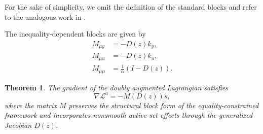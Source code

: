\documentclass[11pt]{article}
\newcommand{\DLag}{\mathcal L^a}
\newtheorem{theorem}{Theorem}
\begin{document}
For the sake of simplicity, we omit the definition of the standard blocks and refer to the analogous work in \cite{walther2018equality}.

The inequality-dependent blocks are given by
\begin{align}
M_{\mu y}
&=
-D(z)k_y,
\\
M_{\mu u}
&=
-D(z)k_u,
\\
M_{\mu\mu}
&=
\frac1\alpha(I-D(z)).
\end{align}

\begin{theorem}
The gradient of the doubly augmented Lagrangian satisfies
\begin{equation}
\nabla \DLag = -M(D(z))s,
\label{eq:mainrepresentation}
\end{equation}
where the matrix $M$ preserves the structural block form of the equality-constrained framework and incorporates nonsmooth active-set effects through the generalized Jacobian $D(z)$.
\end{theorem}
\end{document}
